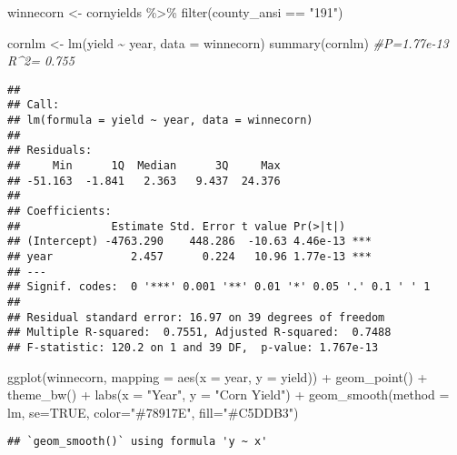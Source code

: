 \documentclass[
]{book}
\newenvironment{Shaded}{\begin{snugshade}}{\end{snugshade}}
\newcommand{\AttributeTok}[1]{\textcolor[rgb]{0.77,0.63,0.00}{#1}}
\newcommand{\CommentTok}[1]{\textcolor[rgb]{0.56,0.35,0.01}{\textit{#1}}}
\newcommand{\ConstantTok}[1]{\textcolor[rgb]{0.00,0.00,0.00}{#1}}
\newcommand{\FunctionTok}[1]{\textcolor[rgb]{0.00,0.00,0.00}{#1}}
\newcommand{\NormalTok}[1]{#1}
\newcommand{\OtherTok}[1]{\textcolor[rgb]{0.56,0.35,0.01}{#1}}
\newcommand{\SpecialCharTok}[1]{\textcolor[rgb]{0.00,0.00,0.00}{#1}}
\newcommand{\StringTok}[1]{\textcolor[rgb]{0.31,0.60,0.02}{#1}}
\begin{document}
\begin{Shaded}
\begin{Highlighting}[]
\NormalTok{winnecorn }\OtherTok{\textless{}{-}}\NormalTok{ cornyields }\SpecialCharTok{\%\textgreater{}\%}
  \FunctionTok{filter}\NormalTok{(county\_ansi }\SpecialCharTok{==} \StringTok{"191"}\NormalTok{)}

\NormalTok{cornlm }\OtherTok{\textless{}{-}} \FunctionTok{lm}\NormalTok{(yield }\SpecialCharTok{\textasciitilde{}}\NormalTok{ year, }\AttributeTok{data =}\NormalTok{ winnecorn)}
\FunctionTok{summary}\NormalTok{(cornlm) }\CommentTok{\#P=1.77e{-}13 R\^{}2= 0.755}
\end{Highlighting}
\end{Shaded}

\begin{verbatim}
## 
## Call:
## lm(formula = yield ~ year, data = winnecorn)
## 
## Residuals:
##     Min      1Q  Median      3Q     Max 
## -51.163  -1.841   2.363   9.437  24.376 
## 
## Coefficients:
##              Estimate Std. Error t value Pr(>|t|)    
## (Intercept) -4763.290    448.286  -10.63 4.46e-13 ***
## year            2.457      0.224   10.96 1.77e-13 ***
## ---
## Signif. codes:  0 '***' 0.001 '**' 0.01 '*' 0.05 '.' 0.1 ' ' 1
## 
## Residual standard error: 16.97 on 39 degrees of freedom
## Multiple R-squared:  0.7551, Adjusted R-squared:  0.7488 
## F-statistic: 120.2 on 1 and 39 DF,  p-value: 1.767e-13
\end{verbatim}

\begin{Shaded}
\begin{Highlighting}[]
\FunctionTok{ggplot}\NormalTok{(winnecorn, }\AttributeTok{mapping =} \FunctionTok{aes}\NormalTok{(}\AttributeTok{x =}\NormalTok{ year, }\AttributeTok{y =}\NormalTok{ yield)) }\SpecialCharTok{+}
  \FunctionTok{geom\_point}\NormalTok{() }\SpecialCharTok{+}
  \FunctionTok{theme\_bw}\NormalTok{() }\SpecialCharTok{+}
  \FunctionTok{labs}\NormalTok{(}\AttributeTok{x =} \StringTok{"Year"}\NormalTok{, }\AttributeTok{y =} \StringTok{"Corn Yield"}\NormalTok{) }\SpecialCharTok{+}
  \FunctionTok{geom\_smooth}\NormalTok{(}\AttributeTok{method =}\NormalTok{ lm, }\AttributeTok{se=}\ConstantTok{TRUE}\NormalTok{, }\AttributeTok{color=}\StringTok{"\#78917E"}\NormalTok{, }\AttributeTok{fill=}\StringTok{"\#C5DDB3"}\NormalTok{)}
\end{Highlighting}
\end{Shaded}

\begin{verbatim}
## `geom_smooth()` using formula 'y ~ x'
\end{verbatim}
\end{document}
